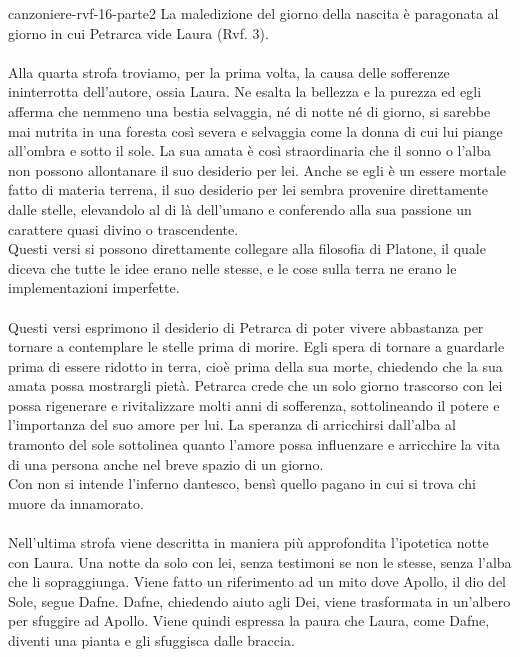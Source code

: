 \documentclass[preview]{standalone}
\begin{document}
\begin{snippet}{canzoniere-rvf-16-parte2}
    La maledizione del giorno della nascita è paragonata al giorno in cui Petrarca vide Laura (Rvf. 3).
    \\\\
     Alla quarta strofa troviamo, per la prima volta, la causa delle sofferenze ininterrotta dell'autore,
    ossia Laura. Ne esalta la bellezza e la purezza ed egli afferma che nemmeno una bestia selvaggia,
    né di notte né di giorno, si sarebbe mai nutrita in una foresta così severa
    e selvaggia come la donna di cui lui piange all'ombra e sotto il sole.
    La sua amata è così straordinaria che il sonno o
    l'alba non possono allontanare il suo desiderio per lei.
    Anche se egli è un essere mortale fatto di materia terrena,
    il suo desiderio per lei sembra provenire direttamente dalle stelle,
    elevandolo al di là dell'umano e conferendo alla sua passione un carattere
    quasi divino o trascendente. \\
    Questi versi si possono direttamente collegare alla filosofia di Platone, il quale
    diceva che tutte le idee erano nelle stesse, e le cose sulla terra ne erano le implementazioni
    imperfette.
    \\\\
     Questi versi esprimono il desiderio di Petrarca di poter vivere abbastanza
    per tornare a contemplare le stelle prima di morire.
    Egli spera di tornare a guardarle prima di essere ridotto in terra,
    cioè prima della sua morte, chiedendo che la sua amata possa mostrargli pietà.
    Petrarca crede che un solo giorno trascorso con lei possa rigenerare e rivitalizzare
    molti anni di sofferenza, sottolineando il potere e l'importanza del suo amore per lui.
    La speranza di arricchirsi dall'alba al tramonto del sole sottolinea quanto l'amore possa
    influenzare e arricchire la vita di una persona anche nel breve spazio di un giorno. \\
    Con  non si intende l'inferno dantesco, bensì quello pagano in cui
    si trova chi muore da innamorato.
    \\\\
     Nell'ultima strofa viene descritta in maniera più approfondita l'ipotetica notte con Laura.
    Una notte da solo con lei, senza testimoni se non le stesse, senza l'alba che li sopraggiunga.
    Viene fatto un riferimento ad un mito dove Apollo, il dio del Sole, segue Dafne.
    Dafne, chiedendo aiuto agli Dei, viene trasformata in un'albero per sfuggire ad Apollo.
    Viene quindi espressa la paura che Laura, come Dafne, diventi una pianta e gli sfuggisca dalle braccia.

\end{snippet}
\end{document}
